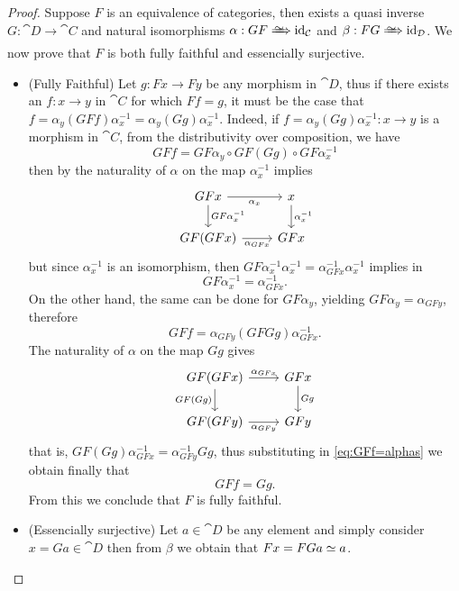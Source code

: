 \begin{proof}
Suppose \(F\) is an equivalence of categories, then exists a quasi inverse
\(G: \cat D \to \cat C\) and natural isomorphisms
\(\alpha: G F \isonat \Id_{\cat C}\) and \(\beta: F G \isonat \Id_{\cat D}\). We
now prove that \(F\) is both fully faithful and essencially surjective.

\begin{itemize}\setlength\itemsep{0em}
\item (Fully Faithful) Let \(g: Fx \to Fy\) be any morphism in \(\cat D\), thus
  if there exists an \(f: x \to y\) in \(\cat C\) for which \(F f = g\), it must
  be the case that
  \(f = \alpha_y (G F f) \alpha_x^{-1} = \alpha_y (G g) \alpha_x^{-1}\). Indeed,
  if \(f = \alpha_y (G g) \alpha_x^{-1}: x \to y\) is a morphism in \(\cat C\),
  from the distributivity over composition, we have
  \[
  G F f = G F \alpha_y \circ G F (G g) \circ G F \alpha_x^{-1}
  \]
  then by the naturality of \(\alpha\) on the map \(\alpha_x^{-1}\) implies
  \[
  \begin{tikzcd}
  G F x \ar[d, "G F \alpha_x^{-1}"] \ar[r, "\alpha_x"']
  & x \ar[d, "\alpha_x^{-1}"] \\
  G F (G F x) \ar[r, "\alpha_{G F x}"'] & G F x
  \end{tikzcd}
  \]
  but since \(\alpha_x^{-1}\) is an isomorphism, then
  \(G F \alpha_x^{-1} \alpha_x^{-1} = \alpha_{G F x}^{-1} \alpha_x^{-1}\)
  implies in
  \[
  G F \alpha_x^{-1} = \alpha_{G F x}^{-1}.
  \]
  On the other hand, the same can be done for \(G F \alpha_y\), yielding
  \(G F \alpha_y = \alpha_{G F y}\), therefore
  \begin{equation}\label{eq:GFf=alphas}
  G F f = \alpha_{G F y} (G F G g) \alpha_{G F x}^{-1}.
  \end{equation}
  The naturality of \(\alpha\) on the map \(G g\) gives
  \[
  \begin{tikzcd}
  G F (G F x) \ar[r, "\alpha_{G F x}"] \ar[d, "G F (G g)"']
  & G F x \ar[d, "G g"] \\
  G F (G F y) \ar[r, "\alpha_{G F y}"'] & G F y
  \end{tikzcd}
  \]
  that is, \(G F (G g) \alpha_{G F x}^{-1} = \alpha_{G F y}^{-1} G g\), thus
  substituting in \cref{eq:GFf=alphas} we obtain finally that
  \[
  G F f = G g.
  \]
  From this we conclude that \(F\) is fully faithful.

\item (Essencially surjective) Let \(a \in \cat D\) be any element and simply
  consider \(x = G a \in \cat D\) then from \(\beta\) we obtain that
  \(Fx = F G a \simeq a\).
\end{itemize}


\end{proof}
